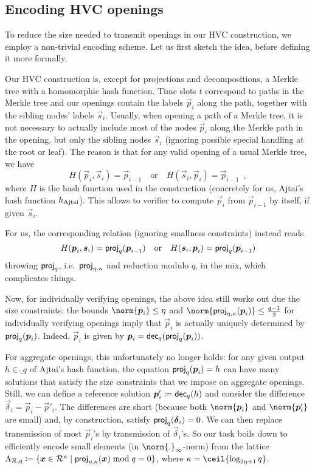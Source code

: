 \subsection{Encoding HVC openings}\label{sect:efficientencoding}


To reduce the size needed to transmit openings in our HVC construction, we employ a non-trivial encoding scheme.
Let us first sketch the idea, before defining it more formally.

Our HVC construction is, except for projections and decompositions, a Merkle tree with a homomorphic hash function.
Time slots $t$ correspond to paths in the Merkle tree and our openings contain the labels $\vec{p}_i$ along the path, together with the sibling nodes' labels $\vec{s}_i$.
Usually, when opening a path of a Merkle tree, it is not necessary to actually include most of the nodes $\vec{p}_i$ along the Merkle path in the opening, but only the sibling nodes $\vec{s}_i$ (ignoring possible special handling at the root or leaf).
The reason is that for any valid opening of a usual Merkle tree, we have 
\[
 H(\vec{p}_i,\vec{s}_i) = \vec{p}_{i-1} \quad\text{or}\quad H(\vec{s}_i,\vec{p}_i) = \vec{p}_{i-1}\enspace, 
\]
where $H$ is the hash function used in the construction (concretely for us, Ajtai's hash function $h_\mathrm{Ajtai}$).
This allows to verifier to compute $\vec{p}_i$ from $\vec{p}_{i-1}$ by itself, if given $\vec{s}_i$.

For us, the corresponding relation (ignoring smallness constraints) instead reads
\[
 H(\boldsymbol{p}_i,\boldsymbol{s}_i) =  \mathsf{proj}_{q}(\boldsymbol{p}_{i-1})  \quad\text{or}\quad H(\boldsymbol{s}_i,\boldsymbol{p}_i) = \mathsf{proj}_{q}(\boldsymbol{p}_{i-1})
\]
throwing $\mathsf{proj}_{q}$, i.e.\ $\mathsf{proj}_{\eta,\kappa}$ and reduction modulo $q$, in the mix, which complicates things.

Now, for individually verifying openings, the above idea still works out due the size constraints:
the bounds $\norm{\vec{p}_i} \leq \eta$ and $\norm{\projring(\vec{p}_i)}\leq \tfrac{q-1}{2}$ for individually verifying openings imply that $\vec{p}_i$ is actually uniquely determined by $\mathsf{proj}_{q}(\boldsymbol{p}_i)$.
Indeed, $\vec{p}_i$ is given by $\boldsymbol{p}_i = \mathsf{dec}_{q}(\mathsf{proj}_{q}(\boldsymbol{p}_i))$.

For aggregate openings, this unfortunately no longer holds:
for any given output $h\in\ring_q$ of Ajtai's hash function, the equation $\mathsf{proj}_{q}(\boldsymbol{p}_i) = h$ can have many solutions
that satisfy the size constraints that we impose on aggregate openings.
Still, we can define a reference solution $\boldsymbol{p}_i' \coloneqq \mathsf{dec}_{q}(h)$ and consider the difference $\vec{\delta}_i = \vec{p}_i - \vec{p}'_i$.
The differences are short (because both $\norm{\vec{p}_i}$ and $\norm{\vec{p}'_i}$ are small) and, by construction, satisfy $\mathsf{proj}_{q}(\boldsymbol{\delta}_i) = 0$.
We can then replace transmission of most $\vec{p}_i$'s by transmission of $\vec{\delta}_i$'s.
So our task boils down to efficiently encode small elements (in $\norm{.}_{\infty}$-norm) from the lattice $\Lambda_{\mathcal{R},q} \coloneqq \{\boldsymbol{x}\in\mathcal{R}^\kappa \mid \mathsf{proj}_{\eta,\kappa}(\boldsymbol{x})\bmod q = 0\}$, where $\limbs = \ceil{\log_{2\eta+1}q}$.

